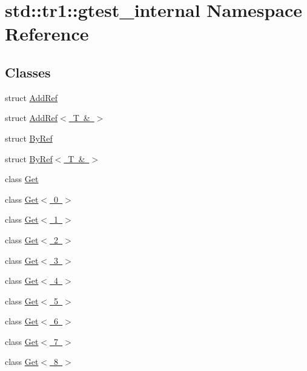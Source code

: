\hypertarget{namespacestd_1_1tr1_1_1gtest__internal}{}\section{std\+::tr1\+::gtest\+\_\+internal Namespace Reference}
\label{namespacestd_1_1tr1_1_1gtest__internal}
\subsection*{Classes}
\begin{DoxyCompactItemize}
\item 
struct \mbox{\hyperlink{structstd_1_1tr1_1_1gtest__internal_1_1AddRef}{Add\+Ref}}
\item 
struct \mbox{\hyperlink{structstd_1_1tr1_1_1gtest__internal_1_1AddRef_3_01T_01_6_01_4}{Add\+Ref$<$ T \& $>$}}
\item 
struct \mbox{\hyperlink{structstd_1_1tr1_1_1gtest__internal_1_1ByRef}{By\+Ref}}
\item 
struct \mbox{\hyperlink{structstd_1_1tr1_1_1gtest__internal_1_1ByRef_3_01T_01_6_01_4}{By\+Ref$<$ T \& $>$}}
\item 
class \mbox{\hyperlink{classstd_1_1tr1_1_1gtest__internal_1_1Get}{Get}}
\item 
class \mbox{\hyperlink{classstd_1_1tr1_1_1gtest__internal_1_1Get_3_010_01_4}{Get$<$ 0 $>$}}
\item 
class \mbox{\hyperlink{classstd_1_1tr1_1_1gtest__internal_1_1Get_3_011_01_4}{Get$<$ 1 $>$}}
\item 
class \mbox{\hyperlink{classstd_1_1tr1_1_1gtest__internal_1_1Get_3_012_01_4}{Get$<$ 2 $>$}}
\item 
class \mbox{\hyperlink{classstd_1_1tr1_1_1gtest__internal_1_1Get_3_013_01_4}{Get$<$ 3 $>$}}
\item 
class \mbox{\hyperlink{classstd_1_1tr1_1_1gtest__internal_1_1Get_3_014_01_4}{Get$<$ 4 $>$}}
\item 
class \mbox{\hyperlink{classstd_1_1tr1_1_1gtest__internal_1_1Get_3_015_01_4}{Get$<$ 5 $>$}}
\item 
class \mbox{\hyperlink{classstd_1_1tr1_1_1gtest__internal_1_1Get_3_016_01_4}{Get$<$ 6 $>$}}
\item 
class \mbox{\hyperlink{classstd_1_1tr1_1_1gtest__internal_1_1Get_3_017_01_4}{Get$<$ 7 $>$}}
\item 
class \mbox{\hyperlink{classstd_1_1tr1_1_1gtest__internal_1_1Get_3_018_01_4}{Get$<$ 8 $>$}}
\item 

\end{DoxyCompactItemize}
